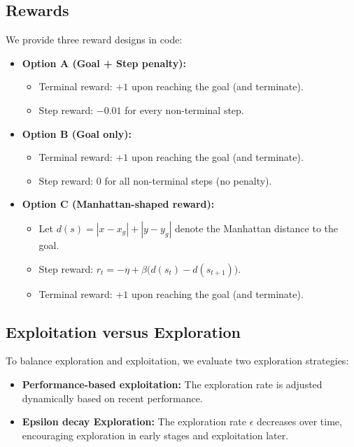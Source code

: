 \documentclass[12pt]{article}
\begin{document}
\subsection{Rewards}
We provide three reward designs in code:
    \begin{itemize}
        \item \textbf{Option A (Goal + Step penalty):}
    \begin{itemize}
        \item Terminal reward: $+1$ upon reaching the goal (and terminate).
        \item Step reward: $-0.01$ for every non-terminal step.
    \end{itemize}

    \item \textbf{Option B (Goal only):}
        \begin{itemize}
            \item Terminal reward: $+1$ upon reaching the goal (and terminate).
            \item Step reward: $0$ for all non-terminal steps (no penalty).
        \end{itemize}

    \item \textbf{Option C (Manhattan-shaped reward):}
        \begin{itemize}
            \item Let $d(s)=|x-x_g|+|y-y_g|$ denote the Manhattan distance to the goal.
            \item Step reward: $r_t=-\eta+\beta\bigl(d(s_t)-d(s_{t+1})\bigr)$.
            \item Terminal reward: $+1$ upon reaching the goal (and terminate).
        \end{itemize}
    \end{itemize}


\subsection{Exploitation versus Exploration}

To balance exploration and exploitation, we evaluate two exploration strategies:

\begin{itemize}
\item \textbf{Performance-based exploitation:} 
The exploration rate is adjusted dynamically based on recent performance.

\item \textbf{Epsilon decay Exploration:} 
The exploration rate $\epsilon$ decreases over time, 
encouraging exploration in early stages and exploitation later.
\end{itemize}
\end{document}
